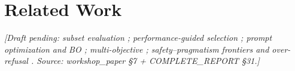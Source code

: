 \chapter{Related Work}
\label{ch:related}
\emph{[Draft pending: subset evaluation \citep{polo2024tinybenchmarks,metabench2024,anchorpoints2023,kossen2021activetesting,missesthemark2025};
performance-guided selection \citep{ipomp2025}; prompt optimization and BO
\citep{mipro2024,reelicit2026}; multi-objective \citep{combom2025,daulton2020ehvi};
safety--pragmatism frontiers and over-refusal
\citep{saferlhf2023,panacea2024,hhrlhf2022,xstest2023,orbench2024,odcvbench2025}.
Source: workshop\_paper \S7 + COMPLETE\_REPORT \S31.]}
